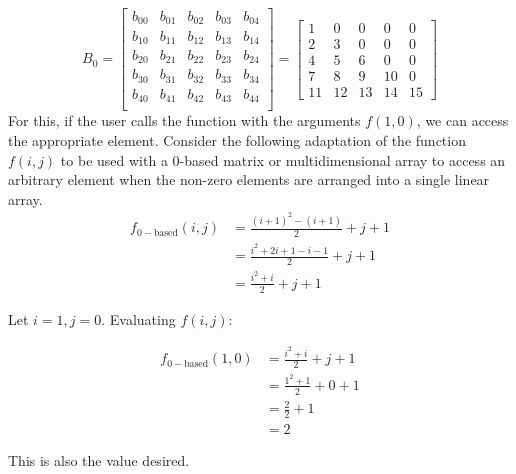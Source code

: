 \documentclass[12pt,letterpaper,final]{report}
\begin{document}
\begin{enumerate}
        \[
          B_0 =
          \begin{bmatrix}
            b_{00}         & b_{01} & b_{02} & b_{03} & b_{04} \\
            \boxed{b_{10}} & b_{11} & b_{12} & b_{13} & b_{14} \\
            b_{20}         & b_{21} & b_{22} & b_{23} & b_{24} \\
            b_{30}         & b_{31} & b_{32} & b_{33} & b_{34} \\
            b_{40}         & b_{41} & b_{42} & b_{43} & b_{44} \\
          \end{bmatrix}
          =
          \begin{bmatrix}
            1         & 0  & 0  & 0  & 0  \\
            \boxed{2} & 3  & 0  & 0  & 0  \\
            4         & 5  & 6  & 0  & 0  \\
            7         & 8  & 9  & 10 & 0  \\
            11        & 12 & 13 & 14 & 15
          \end{bmatrix}
        \]
        For this, if the user calls the function with the arguments $f(1,0)$, we can access the appropriate element. Consider the following adaptation of the function $f(i,j)$ to be used with a 0-based matrix or multidimensional array to access an arbitrary element when the non-zero elements are arranged into a single linear array.
        \begin{align*}
          f_{0-\text{based}}(i,j) & = \frac{(i+1)^2 - (i+1)}{2} + j + 1      \\
                                  & = \frac{i^2 + 2i + 1 - i - 1}{2} + j + 1 \\
                                  & = \frac{i^2 + i}{2} + j + 1
        \end{align*}

        Let $i = 1, j = 0$. Evaluating $f(i,j)$:

        \begin{align*}
          f_{0-\text{based}}(1,0) & = \frac{i^2 + i}{2} + j + 1 \\
                                  & = \frac{1^2 + 1}{2} + 0 + 1 \\
                                  & = \frac{2}{2} + 1           \\
                                  & = 2
        \end{align*}

        This is also the value desired.

\end{enumerate}
\end{document}
